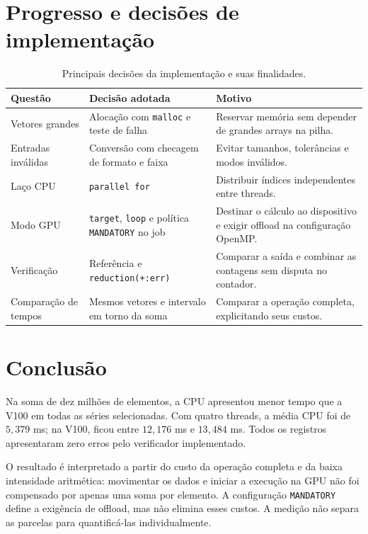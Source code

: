 \documentclass[12pt,a4paper]{article}
\begin{document}
\section{Progresso e decisões de implementação}
\begin{table}[H]
\centering\small
\begin{tabular}{p{3cm}p{5.1cm}p{5.1cm}}
\toprule
Questão & Decisão adotada & Motivo\\
\midrule
Vetores grandes & Alocação com \texttt{malloc} e teste de falha & Reservar memória sem depender de grandes arrays na pilha.\\[3pt]
Entradas inválidas & Conversão com checagem de formato e faixa & Evitar tamanhos, tolerâncias e modos inválidos.\\[3pt]
Laço CPU & \texttt{parallel for} & Distribuir índices independentes entre threads.\\[3pt]
Modo GPU & \texttt{target}, \texttt{loop} e política \texttt{MANDATORY} no job & Destinar o cálculo ao dispositivo e exigir offload na configuração OpenMP.\\[3pt]
Verificação & Referência e \texttt{reduction(+:err)} & Comparar a saída e combinar as contagens sem disputa no contador.\\[3pt]
Comparação de tempos & Mesmos vetores e intervalo em torno da soma & Comparar a operação completa, explicitando seus custos.\\
\bottomrule
\end{tabular}
\caption{Principais decisões da implementação e suas finalidades.}
\end{table}

\section{Conclusão}
Na soma de dez milhões de elementos, a CPU apresentou menor tempo que a V100 em todas as séries selecionadas. Com quatro threads, a média CPU foi de $5{,}379$ ms; na V100, ficou entre $12{,}176$ ms e $13{,}484$ ms. Todos os registros apresentaram zero erros pelo verificador implementado.

O resultado é interpretado a partir do custo da operação completa e da baixa intensidade aritmética: movimentar os dados e iniciar a execução na GPU não foi compensado por apenas uma soma por elemento. A configuração \texttt{MANDATORY} define a exigência de offload, mas não elimina esses custos. A medição não separa as parcelas para quantificá-las individualmente.
\end{document}

